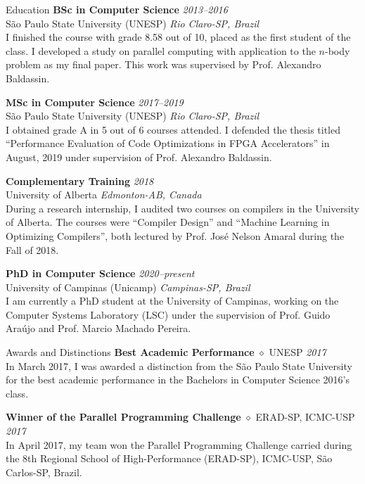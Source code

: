 \documentclass{resume}
\begin{document}

\begin{rSection}{Education}
{\bf BSc in Computer Science} \hfill {\em 2013--2016} \\
{\sc São Paulo State University (UNESP)} \hfill {\em Rio Claro-SP, Brazil} \\
I finished the course with grade 8.58 out of 10, placed as the first student of
the class. I developed a study on parallel computing with application to the
$n$-body problem as my final paper. This work was supervised by Prof. Alexandro
Baldassin.

{\bf MSc in Computer Science} \hfill {\em 2017--2019} \\
{\sc São Paulo State University (UNESP)} \hfill {\em Rio Claro-SP, Brazil} \\
I obtained grade A in 5 out of 6 courses attended. I defended the thesis titled
``Performance Evaluation of Code Optimizations in FPGA Accelerators'' in August,
2019 under supervision of Prof. Alexandro Baldassin.

{\bf Complementary Training} \hfill {\em 2018} \\
{\sc University of Alberta} \hfill {\em Edmonton-AB, Canada} \\
During a research internship, I audited two courses on compilers in the
University of Alberta. The courses were ``Compiler Design'' and ``Machine
Learning in Optimizing Compilers'', both lectured by Prof. José Nelson Amaral
during the Fall of 2018.

{\bf PhD in Computer Science} \hfill {\em 2020--present} \\
{\sc University of Campinas (Unicamp)} \hfill {\em Campinas-SP, Brazil} \\
I am currently a PhD student at the University of Campinas, working on the
Computer Systems Laboratory (LSC) under the supervision of Prof. Guido Araújo
and Prof. Marcio Machado Pereira.
\end{rSection}


\begin{rSection}{Awards and Distinctions}
{\bf Best Academic Performance} $\diamond$ {UNESP} \hfill{\em 2017} \\
In March 2017, I was awarded a distinction from the São Paulo State University
for the best academic performance in the Bachelors in Computer Science 2016's
class.

{\bf Winner of the Parallel Programming Challenge} $\diamond$ {ERAD-SP, ICMC-USP} \hfill{\em 2017} \\
In April 2017, my team won the Parallel Programming Challenge carried during the
8th Regional School of High-Performance (ERAD-SP), ICMC-USP, São Carlos-SP,
Brazil.
\end{rSection}
\end{document}
